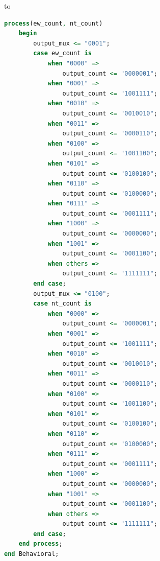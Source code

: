to\documentclass[11pt]{article}
\begin{document}
\begin{appendices}
\begin{lstlisting}[language=VHDL]
    process(ew_count, nt_count)
    begin
        output_mux <= "0001";
        case ew_count is
            when "0000" =>
                output_count <= "0000001";
            when "0001" =>
                output_count <= "1001111";
            when "0010" =>
                output_count <= "0010010";
            when "0011" =>
                output_count <= "0000110";
            when "0100" =>
                output_count <= "1001100";
            when "0101" =>
                output_count <= "0100100";
            when "0110" =>
                output_count <= "0100000";
            when "0111" =>
                output_count <= "0001111";
            when "1000" =>
                output_count <= "0000000";
            when "1001" =>
                output_count <= "0001100";
            when others =>
                output_count <= "1111111";
        end case;
        output_mux <= "0100";
        case nt_count is
            when "0000" =>
                output_count <= "0000001";
            when "0001" =>
                output_count <= "1001111";
            when "0010" =>
                output_count <= "0010010";
            when "0011" =>
                output_count <= "0000110";
            when "0100" =>
                output_count <= "1001100";
            when "0101" =>
                output_count <= "0100100";
            when "0110" =>
                output_count <= "0100000";
            when "0111" =>
                output_count <= "0001111";
            when "1000" =>
                output_count <= "0000000";
            when "1001" =>
                output_count <= "0001100";
            when others =>
                output_count <= "1111111";
        end case;
    end process;
end Behavioral;
\end{lstlisting}


\end{appendices}
\end{document}
